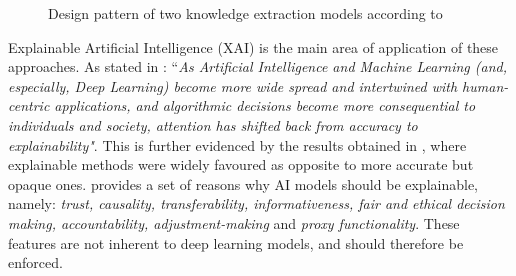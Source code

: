 \begin{figure}[t!]
    \centering
    \caption{Design pattern of two knowledge extraction models according to \cite{van_bekkum_modular_2021}}
    \label{fig:van_bekkum_explain_complete}
\end{figure}

Explainable Artificial Intelligence (XAI) is the main area of application of these approaches. As stated in \cite{angelov_explainable_2021}: ``\textit{As Artificial Intelligence and Machine Learning (and, especially, Deep Learning) become more wide spread and intertwined with human-centric applications, and algorithmic decisions become more consequential to individuals and society, attention has shifted back from accuracy to explainability"}. This is further evidenced by the results obtained in \cite{amador_systematic_review_2019}, where explainable methods were widely favoured as opposite to more accurate but opaque ones. \cite{burkart_survey_2021} provides a set of reasons why AI models should be explainable, namely: \textit{trust, causality, transferability, informativeness, fair and ethical decision making, accountability, adjustment-making} and \textit{proxy functionality}. These features are not inherent to deep learning models, and should therefore be enforced.

